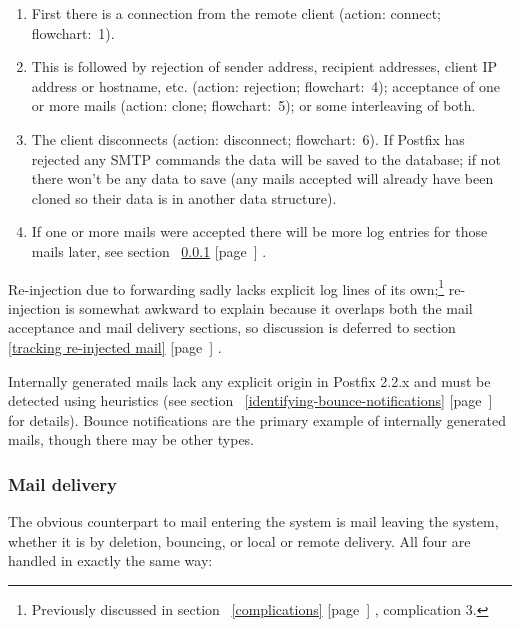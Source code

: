 \documentclass[a4paper,12pt,draft]{article}
\newcommand{\refwithpage}[1]{%
    \empty{}\ref{#1} [page~\pageref{#1}]%
}
\begin{document}
\begin{enumerate}
        
    \item First there is a connection from the remote client
        (action: connect; flowchart:~1).

    \item This is followed by rejection of sender address, recipient
        addresses, client IP address or hostname, etc. (action: rejection;
        flowchart:~4); acceptance of one or more mails (action: clone;
        flowchart:~5); or some interleaving of both.
        
    \item The client disconnects (action: disconnect; flowchart:~6).  If
        Postfix has rejected any SMTP commands the data will be saved to
        the database; if not there won't be any data to save (any mails
        accepted will already have been cloned so their data is in another
        data structure).

    \item If one or more mails were accepted there will be more log entries
        for those mails later, see section~\refwithpage{mail-delivery}.

\end{enumerate}

Re-injection due to forwarding sadly lacks explicit log lines of its
own;\footnote{Previously discussed in section~\refwithpage{complications},
complication 3.} re-injection is somewhat awkward to explain because it
overlaps both the mail acceptance and mail delivery sections, so discussion
is deferred to section~\refwithpage{tracking re-injected mail}.

Internally generated mails lack any explicit origin in Postfix 2.2.x and
must be detected using heuristics (see
section~\refwithpage{identifying-bounce-notifications} for details).
Bounce notifications are the primary example of internally generated mails,
though there may be other types.

\subsubsection{Mail delivery}

\label{mail-delivery}

The obvious counterpart to mail entering the system is mail leaving the
system, whether it is by deletion, bouncing, or local or remote delivery.
All four are handled in exactly the same way:
\end{document}
